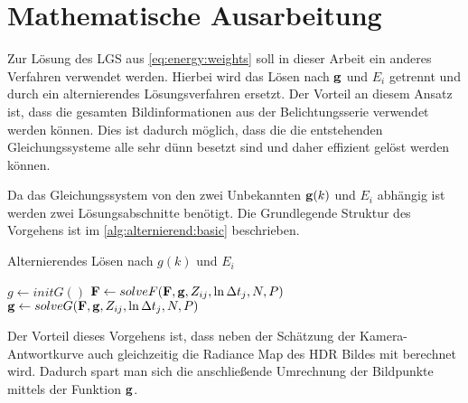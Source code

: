 \chapter{Mathematische Ausarbeitung}
\label{chap:maths}
Zur Lösung des \gls{LGS} aus \autoref{eq:energy:weights} soll in dieser Arbeit ein anderes Verfahren verwendet werden. Hierbei wird das Lösen nach $\b g$ und $E_i$ getrennt und durch ein alternierendes Lösungsverfahren ersetzt. Der Vorteil an diesem Ansatz ist, dass die gesamten Bildinformationen aus der Belichtungsserie verwendet werden können. Dies ist dadurch möglich, dass die die entstehenden Gleichungssysteme alle sehr dünn besetzt sind und daher effizient gelöst werden können.

Da das Gleichungssystem von den zwei Unbekannten $\mathbf g(k)$ und $E_i$ abhängig ist werden zwei Lösungsabschnitte benötigt. Die Grundlegende Struktur des Vorgehens ist im \autoref{alg:alternierend:basic} beschrieben.

\begin{Algorithmus} %
\caption{Alternierendes Lösen nach $g(k)$ und $E_i$}
\label{alg:alternierend:basic}
\begin{algorithmic}
	\State $g \gets initG()$
		\State $\mathbf F \gets solveF(\mathbf F, \mathbf g, Z_{ij}, \ln \Delta t_j, N, P)$ 
		\State $\mathbf g \gets solveG(\mathbf F, \mathbf g, Z_{ij}, \ln \Delta t_j, N, P)$
	\EndWhile
	\State \Return [$\b g$, $\b F$]
\EndFunction
\end{algorithmic}
\end{Algorithmus}

Der Vorteil dieses Vorgehens ist, dass neben der Schätzung der Kamera-Antwortkurve auch gleichzeitig die \gls{Radiance Map} des \gls{HDR} Bildes mit berechnet wird. Dadurch spart man sich die anschließende Umrechnung der Bildpunkte mittels der Funktion $\b g$.

